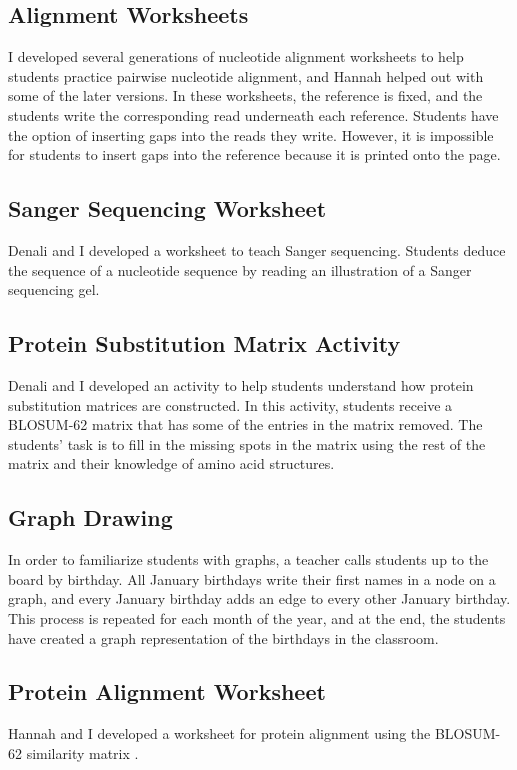 \documentclass{report}
\begin{document}
\subsection{Alignment Worksheets}
I developed several generations of nucleotide alignment worksheets to help students practice pairwise nucleotide alignment, and Hannah helped out with some of the later versions. In these worksheets, the reference is fixed, and the students write the corresponding read underneath each reference. Students have the option of inserting gaps into the reads they write. However, it is impossible for students to insert gaps into the reference because it is printed onto the page.

\subsection{Sanger Sequencing Worksheet}
Denali and I developed a worksheet to teach Sanger sequencing. Students deduce the sequence of a nucleotide sequence by reading an illustration of a Sanger sequencing gel.

\subsection{Protein Substitution Matrix Activity}
Denali and I developed an activity to help students understand how protein substitution matrices are constructed. In this activity, students receive a BLOSUM-62 matrix that has some of the entries in the matrix removed. The students' task is to fill in the missing spots in the matrix using the rest of the matrix and their knowledge of amino acid structures.

\subsection{Graph Drawing}
In order to familiarize students with graphs, a teacher calls students up to the board by birthday. All January birthdays write their first names in a node on a graph, and every January birthday adds an edge to every other January birthday. This process is repeated for each month of the year, and at the end, the students have created a graph representation of the birthdays in the classroom.

\subsection{Protein Alignment Worksheet}
Hannah and I developed a worksheet for protein alignment using the BLOSUM-62 similarity matrix \cite{henikoff1992amino}.
\end{document}
